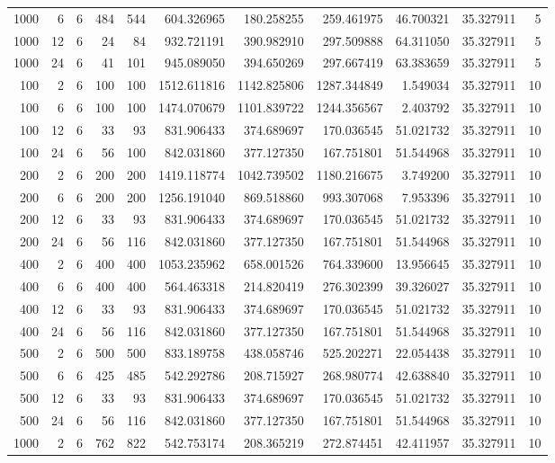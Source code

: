 \begin{table}
\begin{tabular}{rrrrrrrrrrr}
1000 & 6 & 6 & 484 & 544 & 604.326965 & 180.258255 & 259.461975 & 46.700321 & 35.327911 & 5 \\
1000 & 12 & 6 & 24 & 84 & 932.721191 & 390.982910 & 297.509888 & 64.311050 & 35.327911 & 5 \\
1000 & 24 & 6 & 41 & 101 & 945.089050 & 394.650269 & 297.667419 & 63.383659 & 35.327911 & 5 \\
100 & 2 & 6 & 100 & 100 & 1512.611816 & 1142.825806 & 1287.344849 & 1.549034 & 35.327911 & 10 \\
100 & 6 & 6 & 100 & 100 & 1474.070679 & 1101.839722 & 1244.356567 & 2.403792 & 35.327911 & 10 \\
100 & 12 & 6 & 33 & 93 & 831.906433 & 374.689697 & 170.036545 & 51.021732 & 35.327911 & 10 \\
100 & 24 & 6 & 56 & 100 & 842.031860 & 377.127350 & 167.751801 & 51.544968 & 35.327911 & 10 \\
200 & 2 & 6 & 200 & 200 & 1419.118774 & 1042.739502 & 1180.216675 & 3.749200 & 35.327911 & 10 \\
200 & 6 & 6 & 200 & 200 & 1256.191040 & 869.518860 & 993.307068 & 7.953396 & 35.327911 & 10 \\
200 & 12 & 6 & 33 & 93 & 831.906433 & 374.689697 & 170.036545 & 51.021732 & 35.327911 & 10 \\
200 & 24 & 6 & 56 & 116 & 842.031860 & 377.127350 & 167.751801 & 51.544968 & 35.327911 & 10 \\
400 & 2 & 6 & 400 & 400 & 1053.235962 & 658.001526 & 764.339600 & 13.956645 & 35.327911 & 10 \\
400 & 6 & 6 & 400 & 400 & 564.463318 & 214.820419 & 276.302399 & 39.326027 & 35.327911 & 10 \\
400 & 12 & 6 & 33 & 93 & 831.906433 & 374.689697 & 170.036545 & 51.021732 & 35.327911 & 10 \\
400 & 24 & 6 & 56 & 116 & 842.031860 & 377.127350 & 167.751801 & 51.544968 & 35.327911 & 10 \\
500 & 2 & 6 & 500 & 500 & 833.189758 & 438.058746 & 525.202271 & 22.054438 & 35.327911 & 10 \\
500 & 6 & 6 & 425 & 485 & 542.292786 & 208.715927 & 268.980774 & 42.638840 & 35.327911 & 10 \\
500 & 12 & 6 & 33 & 93 & 831.906433 & 374.689697 & 170.036545 & 51.021732 & 35.327911 & 10 \\
500 & 24 & 6 & 56 & 116 & 842.031860 & 377.127350 & 167.751801 & 51.544968 & 35.327911 & 10 \\
1000 & 2 & 6 & 762 & 822 & 542.753174 & 208.365219 & 272.874451 & 42.411957 & 35.327911 & 10 \\

\end{tabular}
\end{table}
